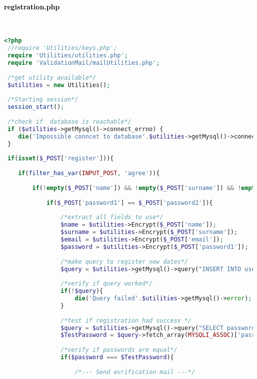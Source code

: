  
 \paragraph{\textcolor{black}{registration.php}}\leavevmode\\
 
 \begin{lstlisting}[language=php]
 <?php
 //require 'Utilities/keys.php';
 require 'Utilities/utilities.php';
 require 'ValidationMail/mailUtilities.php';
 
 /*get utility available*/
 $utilities = new Utilities();
 
 /*Starting session*/
 session_start();
 
 /*check if  database is reachable*/
 if ($utilities->getMysql()->connect_errno) {
 	die('Impossible conncet to database'.$utilities->getMysql()->connect_error);
 }
 
 if(isset($_POST['register'])){
 	
 	if(filter_has_var(INPUT_POST, 'agree')){
 		
 		if(!empty($_POST['name']) && !empty($_POST['surname']) && !empty($_POST['email']) && !empty($_POST['password1']) && !empty($_POST['password2'])){
 			
 			if($_POST['password1'] == $_POST['password2']){
 				
 				/*extract all fields to use*/
 				$name = $utilities->Encrypt($_POST['name']);
 				$surname = $utilities->Encrypt($_POST['surname']);
 				$email = $utilities->Encrypt($_POST['email']);
 				$password = $utilities->Encrypt($_POST['password1']);
 				
 				/*make query to register new dates*/
 				$query = $utilities->getMysql()->query("INSERT INTO user_table1 (name, surname, email, password) VALUES ('{$name}', '{$surname}', '{$email}', '{$password}')");
 				
 				/*verify if query worked*/
 				if(!$query){
 					die('Query failed'.$utilities->getMysql()->error);
 				}
 				
 				/*test if registration had success */
 				$query = $utilities->getMysql()->query("SELECT password FROM user_table1 WHERE (email = '{$email}')");
 				$TestPassword = $query->fetch_array(MYSQLI_ASSOC)['password'];
 				
 				/*verify if passwords are equal*/
 				if($password === $TestPassword){
 					
 					/*--- Send evrification mail ---*/
 					

\end{lstlisting}
